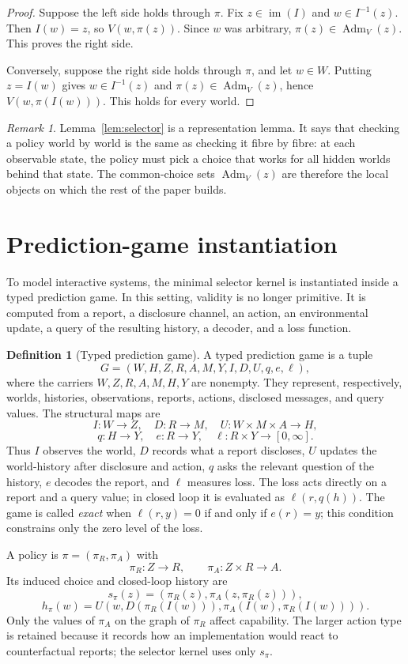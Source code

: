 \documentclass[11pt]{article}
\theoremstyle{plain}
\theoremstyle{definition}
\newtheorem{definition}[theorem]{Definition}
\theoremstyle{remark}
\newtheorem{remark}[theorem]{Remark}
\newcommand{\im}{\operatorname{im}}
\newcommand{\Adm}{\operatorname{Adm}}
\begin{document}
\begin{proof}
Suppose the left side holds through $\pi$. Fix $z\in\im(I)$ and
$w\in I^{-1}(z)$. Then $I(w)=z$, so $V(w,\pi(z))$. Since $w$ was arbitrary,
$\pi(z)\in\Adm_V(z)$. This proves the right side.

Conversely, suppose the right side holds through $\pi$, and let $w\in W$.
Putting $z=I(w)$ gives $w\in I^{-1}(z)$ and
$\pi(z)\in\Adm_V(z)$, hence $V(w,\pi(I(w)))$. This holds for every world.
\end{proof}

\begin{remark}
Lemma~\ref{lem:selector} is a representation lemma. It says that checking a
policy world by world is the same as checking it fibre by fibre: at each
observable state, the policy must pick a choice that works for all hidden worlds
behind that state. The common-choice sets $\Adm_V(z)$ are therefore the local
objects on which the rest of the paper builds.
\end{remark}

\section{Prediction-game instantiation}\label{sec:games}

To model interactive systems, the minimal selector kernel is instantiated inside
a typed prediction game. In this setting, validity is no longer primitive. It is
computed from a report, a disclosure channel, an action, an environmental update,
a query of the resulting history, a decoder, and a loss function.

\begin{definition}[Typed prediction game]\label{def:game}
A typed prediction game is a tuple
\[
G=(W,H,Z,R,A,M,Y,I,D,U,q,e,\ell),
\]
where the carriers $W,Z,R,A,M,H,Y$ are nonempty. They represent, respectively,
worlds, histories, observations, reports, actions, disclosed messages, and query
values. The structural maps are
\[
I:W\to Z,\quad D:R\to M,\quad U:W\times M\times A\to H,
\]
\[
q:H\to Y,\quad e:R\to Y,\quad \ell:R\times Y\to[0,\infty].
\]
Thus $I$ observes the world, $D$ records what a report discloses, $U$ updates the
world-history after disclosure and action, $q$ asks the relevant question of the
history, $e$ decodes the report, and $\ell$ measures loss. The loss acts directly
on a report and a query value; in closed loop it is evaluated as $\ell(r,q(h))$.
The game is called \emph{exact} when $\ell(r,y)=0$ if and only if $e(r)=y$; this
condition constrains only the zero level of the loss.

A policy is $\pi=(\pi_R,\pi_A)$ with
\[
\pi_R:Z\to R,\qquad \pi_A:Z\times R\to A.
\]
Its induced choice and closed-loop history are
\[
s_\pi(z)=(\pi_R(z),\pi_A(z,\pi_R(z))),
\]
\[
h_\pi(w)=U(w,D(\pi_R(I(w))),\pi_A(I(w),\pi_R(I(w)))).
\]
Only the values of $\pi_A$ on the graph of $\pi_R$ affect capability. The larger
action type is retained because it records how an implementation would react to
counterfactual reports; the selector kernel uses only $s_\pi$.
\end{definition}
\end{document}
